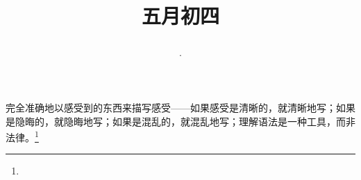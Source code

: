 \title{\date[d=9,m=6,y=2024][year:cn-y,年,month:cn,day:cn,日,·,weekday]·五月初四 }
完全准确地以感受到的东西来描写感受——如果感受是清晰的，就清晰地写；如果是隐晦的，就隐晦地写；如果是混乱的，就混乱地写；理解语法是一种工具，而非法律。\footnote{ }

